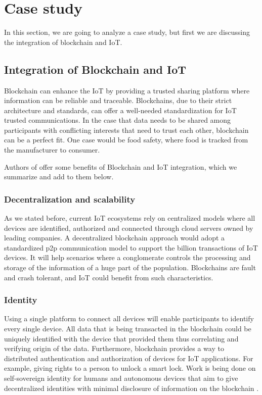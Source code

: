 \section{Case study}
In this section, we are going to analyze a case study, but first we are discussing the integration of blockchain and IoT.

\subsection{Integration of Blockchain and IoT}
Blockchain can enhance the IoT by providing a trusted sharing platform where information can be reliable and traceable. Blockchains, due to their strict architecture and standards, can offer a well-needed standardization for IoT trusted communications. In the case that data needs to be shared among participants with conflicting interests that need to trust each other, blockchain can be a perfect fit. One case would be food safety, where food is tracked from the manufacturer to consumer.

Authors of \cite{reyna2018blockchain} offer some benefits of Blockchain and IoT integration, which we summarize and add to them below. 

\subsubsection{Decentralization and scalability}
As we stated before, current IoT ecosystems rely on centralized models where all devices are identified, authorized and connected through cloud servers owned by leading companies. A decentralized blockchain approach would adopt a standardized \acrshort{p2p} communication model to support the billion transactions of IoT devices. It will help scenarios where a conglomerate controls the processing and storage of the information of a huge part of the population. Blockchains are fault and crash tolerant, and IoT could benefit from such characteristics. 

\subsubsection{Identity}
Using a single platform to connect all devices will enable participants to identify every single device. All data that is being transacted in the blockchain could be uniquely identified with the device that provided them thus correlating and verifying origin of the data. Furthermore, blockchain provides a way to distributed authentication and authorization of devices for IoT applications. For example, giving rights to a person to unlock a smart lock. Work is being done on self-sovereign identity for humans and autonomous devices that aim to give decentralized identities with minimal disclosure of information on the blockchain \cite{khovratovich2017sovrin} \cite{lundkvist2017uport}.

